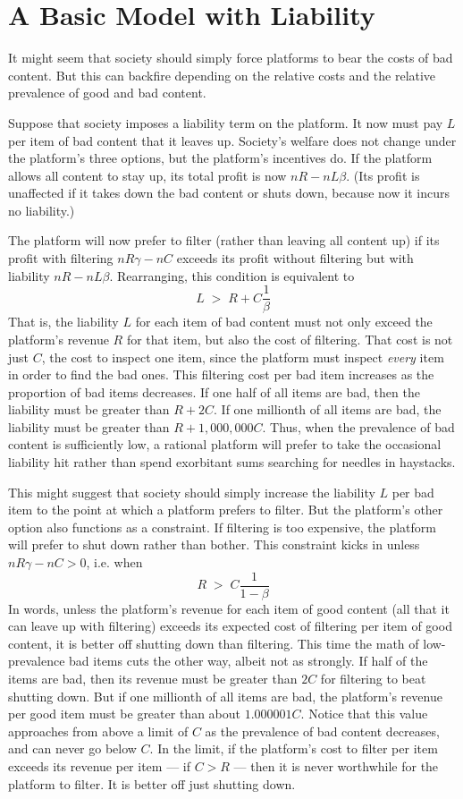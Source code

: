 \documentclass{article}
\begin{document}
\section{A Basic Model with Liability}

It might seem that society should simply force platforms to bear the costs of bad content. But this can backfire depending on the relative costs and the relative prevalence of good and bad content.  

Suppose that society imposes a liability term on the platform. It now must pay $L$ per item of bad content that it leaves up. Society's welfare does not change under the platform's three options, but the platform's incentives do. If the platform allows all content to stay up, its total profit is now $nR - nL\beta$. (Its profit is unaffected if it takes down the bad content or shuts down, because now it incurs no liability.)

The platform will now prefer to filter (rather than leaving all content up) if its profit with filtering $nR\gamma - nC$ exceeds its profit without filtering but with liability $nR - nL\beta$. Rearranging, this condition is equivalent to 
$$
L \;>\; R + C\frac{1}{\beta}
$$
That is, the liability $L$ for each item of bad content must not only exceed the platform's revenue $R$ for that item, but also the cost of filtering. That cost is not just $C$, the cost to inspect one item, since the platform must inspect \emph{every} item in order to find the bad ones. This filtering cost per bad item increases as the proportion of bad items decreases. If one half of all items are bad, then the  liability must be greater than $R + 2C$. If one millionth of all items are bad, the liability must be greater than $R + 1,000,000C$. Thus, when the prevalence of bad content is sufficiently low, a rational platform  will prefer to take the occasional liability hit rather than spend exorbitant sums searching for needles in haystacks.

This might suggest that society should simply increase the liability $L$
per bad item to the point at which a platform prefers to filter. But the platform's other option also functions as a constraint. If filtering is too expensive, the platform will prefer to shut down rather than bother. This constraint kicks in unless $nR\gamma - nC > 0$, i.e. when 
$$
R \;>\; C\frac{1}{1 - \beta}
$$
In words, unless the platform's revenue for each item of good content (all that it can leave up with filtering) exceeds its expected cost of filtering per item of good content, it is better off shutting down than filtering. This time the math of low-prevalence bad items cuts the other way, albeit not as strongly. If half of the items are bad, then its revenue must be greater than $2C$ for filtering to beat shutting down. But if one millionth of all items are bad, the platform's revenue per good item must be greater than about $1.000001C$. Notice that this value approaches from above a limit of $C$ as the prevalence of bad content decreases, and can never go below $C$. In the limit, if the platform's cost to filter per item exceeds its revenue per item --- if $C > R$ --- then it is never worthwhile for the platform to filter. It is better off just shutting down.
\end{document}
